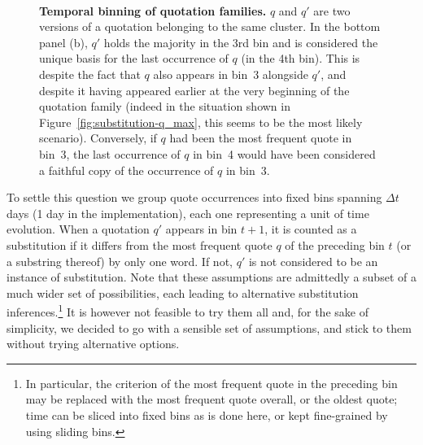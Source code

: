 \begin{figure}[h]
    \centering
	\hfill \\
	\caption{{\bf Temporal binning of quotation families.} $q$ and $q'$ are two versions of a quotation belonging to the same cluster.  In the bottom panel (b), $q'$ holds the majority in the 3rd bin and is considered the unique basis for the last occurrence of $q$ (in the 4th bin). This is despite the fact that $q$ also appears in bin~3 alongside $q'$, and despite it having appeared earlier at the very beginning of the quotation family (indeed in the situation shown in Figure~\ref{fig:substitution-q_max}, this seems to be the most likely scenario). Conversely, if $q$ had been the most frequent quote in bin~3, the last occurrence of $q$ in bin~4 would have been considered a faithful copy of the occurrence of $q$ in bin~3.}
    \label{fig:substitution-temporal-binning}
\end{figure}

To settle this question we group quote occurrences into fixed bins spanning $\Delta t$ days (1 day in the implementation), each one representing a unit of time evolution.
When a quotation $q'$ appears in bin $t+1$, it is counted as a substitution if it differs from the most frequent quote $q$ of the preceding bin $t$ (or a substring thereof) by only one word. If not, $q'$ is not considered to be an instance of substitution.  %
Note that these assumptions are admittedly a subset of a much wider set of possibilities, each leading to alternative substitution inferences.\footnote{In particular, the criterion of the most frequent quote in the preceding bin may be replaced with the most frequent quote overall, or the oldest quote; time can be sliced into fixed bins as is done here, or kept fine-grained by using sliding bins.}
It is however not feasible to try them all and, for the sake of simplicity, we decided to go with a sensible set of assumptions, and stick to them without trying alternative options.

